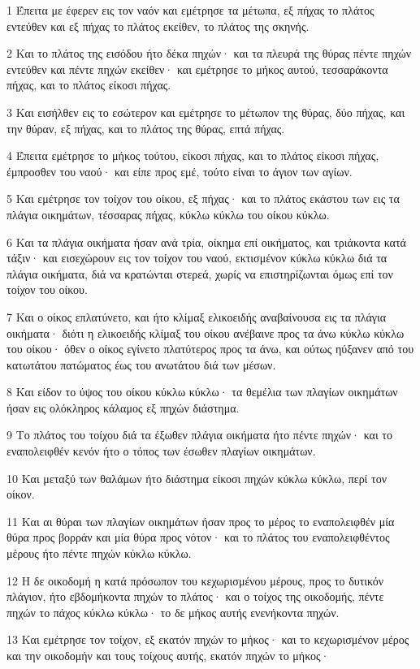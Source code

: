\par 1 Έπειτα με έφερεν εις τον ναόν και εμέτρησε τα μέτωπα, εξ πήχας το πλάτος εντεύθεν και εξ πήχας το πλάτος εκείθεν, το πλάτος της σκηνής.
\par 2 Και το πλάτος της εισόδου ήτο δέκα πηχών· και τα πλευρά της θύρας πέντε πηχών εντεύθεν και πέντε πηχών εκείθεν· και εμέτρησε το μήκος αυτού, τεσσαράκοντα πήχας, και το πλάτος είκοσι πήχας.
\par 3 Και εισήλθεν εις το εσώτερον και εμέτρησε το μέτωπον της θύρας, δύο πήχας, και την θύραν, εξ πήχας, και το πλάτος της θύρας, επτά πήχας.
\par 4 Έπειτα εμέτρησε το μήκος τούτου, είκοσι πήχας, και το πλάτος είκοσι πήχας, έμπροσθεν του ναού· και είπε προς εμέ, τούτο είναι το άγιον των αγίων.
\par 5 Και εμέτρησε τον τοίχον του οίκου, εξ πήχας· και το πλάτος εκάστου των εις τα πλάγια οικημάτων, τέσσαρας πήχας, κύκλω κύκλω του οίκου κύκλω.
\par 6 Και τα πλάγια οικήματα ήσαν ανά τρία, οίκημα επί οικήματος, και τριάκοντα κατά τάξιν· και εισεχώρουν εις τον τοίχον του ναού, εκτισμένον κύκλω κύκλω διά τα πλάγια οικήματα, διά να κρατώνται στερεά, χωρίς να επιστηρίζωνται όμως επί τον τοίχον του οίκου.
\par 7 Και ο οίκος επλατύνετο, και ήτο κλίμαξ ελικοειδής αναβαίνουσα εις τα πλάγια οικήματα· διότι η ελικοειδής κλίμαξ του οίκου ανέβαινε προς τα άνω κύκλω κύκλω του οίκου· όθεν ο οίκος εγίνετο πλατύτερος προς τα άνω, και ούτως ηύξανεν από του κατωτάτου πατώματος έως του ανωτάτου διά των μέσων.
\par 8 Και είδον το ύψος του οίκου κύκλω κύκλω· τα θεμέλια των πλαγίων οικημάτων ήσαν εις ολόκληρος κάλαμος εξ πηχών διάστημα.
\par 9 Το πλάτος του τοίχου διά τα έξωθεν πλάγια οικήματα ήτο πέντε πηχών· και το εναπολειφθέν κενόν ήτο ο τόπος των έσωθεν πλαγίων οικημάτων.
\par 10 Και μεταξύ των θαλάμων ήτο διάστημα είκοσι πηχών κύκλω κύκλω, περί τον οίκον.
\par 11 Και αι θύραι των πλαγίων οικημάτων ήσαν προς το μέρος το εναπολειφθέν μία θύρα προς βορράν και μία θύρα προς νότον· και το πλάτος του εναπολειφθέντος μέρους ήτο πέντε πηχών κύκλω κύκλω.
\par 12 Η δε οικοδομή η κατά πρόσωπον του κεχωρισμένου μέρους, προς το δυτικόν πλάγιον, ήτο εβδομήκοντα πηχών το πλάτος· και ο τοίχος της οικοδομής, πέντε πηχών το πάχος κύκλω κύκλω· το δε μήκος αυτής ενενήκοντα πηχών.
\par 13 Και εμέτρησε τον τοίχον, εξ εκατόν πηχών το μήκος· και το κεχωρισμένον μέρος και την οικοδομήν και τους τοίχους αυτής, εκατόν πηχών το μήκος·
